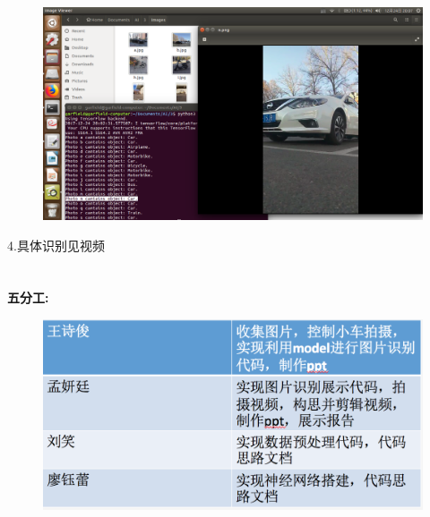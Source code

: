 \documentclass[19pt,a4paper]{article}
\begin{document}
\begin{figure}[H]
 \centering
 \includegraphics[scale=0.5]{right4.png}
\end{figure}
\indent 4.具体识别见视频\\
\\
\\
\indent\textbf{五\quad 分工:}\\
\begin{figure}[H]
 \centering
 \includegraphics[scale=0.6]{分工.png}
\end{figure}
\end{document}
